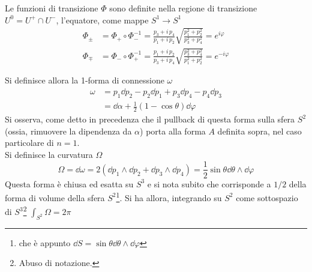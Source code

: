 Le funzioni di transizione $\Phi $ sono definite nella regione di transizione
$U^0 = U^+ \cap U^-$, l'equatore, come mappe $S^1 \to S^1$
\begin{equation}
   \begin{aligned}
  \Phi_\pm & = \Phi _+ \circ \Phi _- ^{-1}
             = \frac{p_3 +  i \, p_4}{p_1 + i \, p_2}
                \sqrt{ \frac{p_1^2 + p_2^2}{p_3^2 + p_4^2} }
             = e^{i\varphi } \\
  \Phi _\mp & = \Phi _- \circ \Phi _+ ^{-1}
             = \frac{p_1 + i \, p_2}{p_3 +  i \, p_4}
                  \sqrt{ \frac{p_3^2 + p_4^2}{p_1^2 + p_2^2}}
             = e^{-i\varphi }
   \end{aligned}
\end{equation}

Si definisce allora la 1-forma di connessione $\omega$
\begin{equation}
   \begin{aligned}
      \omega & = p_1 \dd  p_2 - p_2 \dd  p_1 + p_3 \dd  p_4 - p_4 \dd  p_3 \\
             & = \dd \alpha + \frac{1}{2}(1 - \cos\theta) \dd  \varphi
   \end{aligned}
\end{equation}
Si osserva, come detto in precedenza che il pullback di questa forma sulla sfera
$S^2$ (ossia, rimuovere la dipendenza da $\alpha$) porta alla forma $A$ definita
sopra, nel caso particolare di $n = 1$.\\

Si definisce la curvatura $\Omega$
$$
   \Omega = \dd  \omega = 2 ( \dd  p_1 \wedge \dd  p_2 + \dd  p_3 \wedge \dd  p_4)
          = \frac{1}{2} \sin\theta \dd \theta \wedge \dd \varphi
$$
Questa forma è chiusa ed esatta su $S^3$ e si nota subito che corrisponde a $1/2$
della forma di volume della sfera $S^2$\footnote{
   che è appunto $\dd S = \sin\theta \dd \theta \wedge \dd \varphi $}.
Si ha allora, integrando su $S^2$ come sottospazio di $S^3$\footnote{
   Abuso di notazione.}
$
   \int_{S^2} \Omega = 2\pi
$
